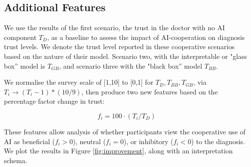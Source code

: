 \documentclass[manuscript,screen,review]{acmart}
\begin{document}
\subsection{Additional Features}

We use the results of the first scenario, the trust in the doctor with no AI component $T_D$, as a baseline to assess the impact of AI-cooperation on diagnosis trust levels. We denote the trust level reported in these cooperative scenarios based on the nature of their model. Scenario two, with the interpretable or "glass box'' model is $T_{GB}$, and scenario three with the "black box'' model $T_{BB}$.

We normalise the survey scale of [1,10] to [0,1] for $T_D, T_{BB}, T_{GB}$, via $T_i \rightarrow (T_i - 1) * (10/9)$, then produce two new features based on the percentage factor change in trust:

\begin{equation}
    f_i = 100 \cdot (T_i / T_D)
\end{equation}

These features allow analysis of whether participants view the cooperative use of AI as beneficial ($f_i > 0$), neutral ($f_i = 0$), or inhibitory ($f_i < 0$) to the diagnosis. We plot the results in Figure \ref{fig:improvement}, along with an interpretation schema.
\end{document}
